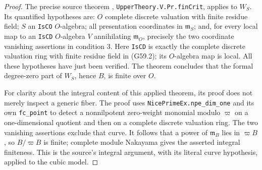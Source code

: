 \begin{proof}
The precise source theorem
,
\texttt{UpperTheory.V.Pr.finCrit}, applies to \(W_S\).
Its quantified hypotheses are: \(O\) complete discrete
valuation with finite residue field; \(S\) an
\texttt{IsCO} \(O\)-algebra; all presentation coordinates
in \(\mathfrak m_S\); and, for every local map to an
\texttt{IsCD} \(O\)-algebra \(V\) annihilating
\(\mathfrak m_O\), precisely the two coordinate
vanishing assertions in condition 3.
Here \texttt{IsCD} is exactly the complete discrete
valuation ring with finite residue field in (G59.2);
its \(O\)-algebra map is local.
All these hypotheses have just been verified.
The theorem concludes that the formal degree-zero part
of \(W_S\), hence \(B\), is finite over \(O\).

For clarity about the integral content of this applied
theorem, its proof does not merely inspect a generic
fiber.  The proof uses \texttt{NicePrimeEx.npe\_dim\_one}
and its own \texttt{fc\_point} to detect a nonnilpotent
zero-weight monomial modulo \(\varpi\) on a
one-dimensional quotient and then on a complete
discrete valuation ring.
The two vanishing assertions exclude that curve.
It follows that a power of \(\mathfrak m_B\) lies in
\(\varpi B\), so \(B/\varpi B\) is finite; complete
module Nakayama gives the asserted integral finiteness.
This is the source's integral argument, with its
literal curve hypothesis, applied to the cubic model.
\end{proof}

